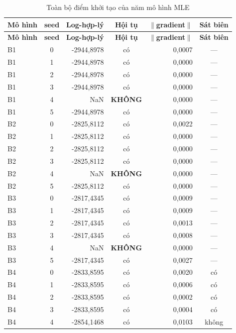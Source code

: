 \documentclass[11pt,a4paper]{article}
\begin{document}
\begin{longtable}{l c r c r c}
\caption{Toàn bộ điểm khởi tạo của năm mô hình MLE}\\
\toprule
\textbf{Mô hình} & \textbf{seed} & \textbf{Log-hợp-lý} & \textbf{Hội tụ} & \textbf{$\|$gradient$\|$} & \textbf{Sát biên} \\
\midrule
\endfirsthead
\toprule
\textbf{Mô hình} & \textbf{seed} & \textbf{Log-hợp-lý} & \textbf{Hội tụ} & \textbf{$\|$gradient$\|$} & \textbf{Sát biên} \\
\midrule
\endhead
\bottomrule
\endfoot
B1 & 0 & -2944{,}8978 & có & 0{,}0007 & --- \\
B1 & 1 & -2944{,}8978 & có & 0{,}0000 & --- \\
B1 & 2 & -2944{,}8978 & có & 0{,}0000 & --- \\
B1 & 3 & -2944{,}8978 & có & 0{,}0000 & --- \\
B1 & 4 & NaN & \textbf{KHÔNG} & 0{,}0000 & --- \\
B1 & 5 & -2944{,}8978 & có & 0{,}0000 & --- \\
\midrule
B2 & 0 & -2825{,}8112 & có & 0{,}0022 & --- \\
B2 & 1 & -2825{,}8112 & có & 0{,}0000 & --- \\
B2 & 2 & -2825{,}8112 & có & 0{,}0000 & --- \\
B2 & 3 & -2825{,}8112 & có & 0{,}0000 & --- \\
B2 & 4 & NaN & \textbf{KHÔNG} & 0{,}0000 & --- \\
B2 & 5 & -2825{,}8112 & có & 0{,}0000 & --- \\
\midrule
B3 & 0 & -2817{,}4345 & có & 0{,}0009 & --- \\
B3 & 1 & -2817{,}4345 & có & 0{,}0009 & --- \\
B3 & 2 & -2817{,}4345 & có & 0{,}0013 & --- \\
B3 & 3 & -2817{,}4345 & có & 0{,}0008 & --- \\
B3 & 4 & NaN & \textbf{KHÔNG} & 0{,}0000 & --- \\
B3 & 5 & -2817{,}4345 & có & 0{,}0027 & --- \\
\midrule
B4 & 0 & -2833{,}8595 & có & 0{,}0020 & có \\
B4 & 1 & -2833{,}8595 & có & 0{,}0006 & có \\
B4 & 2 & -2833{,}8595 & có & 0{,}0002 & có \\
B4 & 3 & -2833{,}8595 & có & 0{,}0004 & có \\
B4 & 4 & -2854{,}1468 & có & 0{,}0103 & không \\

\end{longtable}
\end{document}
